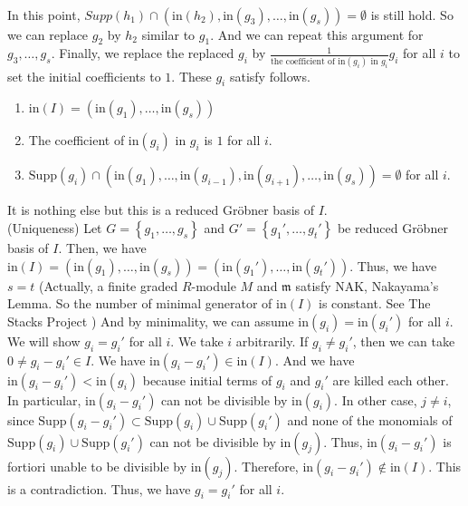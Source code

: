 \documentclass{article}
\begin{document}
\begin{pfsp}
\begin{align}
    \end{align}
    In this point, $Supp(h_1) \cap (\mathrm{in}(h_2), \mathrm{in}(g_3), \ldots, \mathrm{in}(g_s)) = \emptyset$ is still hold. So we can replace $g_2$ by $h_2$ similar to $g_1$. And we can repeat this argument for $g_3, \ldots, g_s$. Finally, we replace the replaced $g_i$ by $\displaystyle{\frac{1}{\text{the coefficient of } \mathrm{in}(g_i) \text{ in } g_i} g_i}$ for all $i$ to set the initial coefficients to $1$. These $g_i$ satisfy follows. 
    \begin{enumerate}
        \item $\mathrm{in}(I) = (\mathrm{in}(g_1), \ldots, \mathrm{in}(g_s))$
        \item The coefficient of $\mathrm{in}(g_i)$ in $g_i$ is $1$ for all $i$.
        \item $\mathrm{Supp}(g_i) \cap (\mathrm{in}(g_1), \ldots, \mathrm{in}(g_{i-1}), \mathrm{in}(g_{i+1}), \ldots, \mathrm{in}(g_s)) = \emptyset$ for all $i$.
    \end{enumerate}
    It is nothing else but this is a reduced Gr\"{o}bner basis of $I$.\\ 
    (Uniqueness) Let $G = \left\{ g_1, \ldots, g_s \right\}$ and $G' = \left\{ g_1', \ldots, g_t' \right\}$ be reduced Gr\"{o}bner basis of $I$. Then, we have $\mathrm{in}(I) = (\mathrm{in}(g_1), \ldots, \mathrm{in}(g_s)) = (\mathrm{in}(g_1'), \ldots, \mathrm{in}(g_t'))$. Thus, we have $s = t$ (Actually, a finite graded $R$-module $M$ and $\mathfrak{m}$ satisfy NAK, Nakayama's Lemma. So the number of minimal generator of $\mathrm{in}(I)$ is constant. See The Stacks Project \cite{stacks-project0EKB}) And by minimality, we can assume $\mathrm{in}(g_i) = \mathrm{in}(g_i')$ for all $i$. We will show $g_i = g_i'$ for all $i$. We take $i$ arbitrarily. If $g_i \neq g_i'$, then we can take $0 \neq g_i - g_i' \in I$. We have $\mathrm{in}(g_i - g_i') \in \mathrm{in}(I)$. And we have $\mathrm{in}(g_i - g_i') < \mathrm{in}(g_i)$ because initial terms of $g_i$ and $g_i'$ are killed each other. In particular, $\mathrm{in}(g_i - g_i')$ can not be divisible by $\mathrm{in}(g_i)$. In other case, $j \neq i$, since $\mathrm{Supp}(g_i - g_i') \subset \mathrm{Supp}(g_i) \cup \mathrm{Supp}(g_i')$ and none of the monomials of $\mathrm{Supp}(g_i) \cup \mathrm{Supp}(g_i')$ can not be divisible by $\mathrm{in}(g_j)$. Thus, $\mathrm{in}(g_i - g_i')$ is fortiori unable to be divisible by $\mathrm{in}(g_j)$. Therefore, $\mathrm{in}(g_i - g_i') \notin \mathrm{in}(I)$. This is a contradiction. Thus, we have $g_i = g_i'$ for all $i$.
\end{pfsp}
\end{document}
